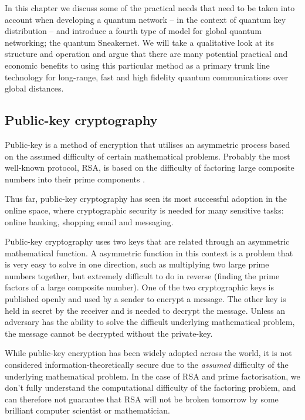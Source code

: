 \documentclass[twocolumn, aps, rmp, amsmath, amssymb, nofootinbib, superscriptaddress, longbibliography, floatfix, table-of-contents, eqsecnum]{revtex4-2}
\begin{document}
In this chapter we discuss some of the practical needs that need to be taken into account when developing a quantum network -- in the context of quantum key distribution -- and introduce a fourth type of model for global quantum networking; the quantum Sneakernet. We will take a qualitative look at its structure and operation and argue that there are many potential practical and economic benefits to using this particular method as a primary trunk line technology for long-range, fast and high fidelity quantum communications over global distances.

\subsection{Public-key cryptography}

Public-key is a method of encryption that utilises an asymmetric process based on the assumed difficulty of certain mathematical problems. Probably the most well-known protocol, RSA, is based on the difficulty of factoring large composite numbers into their prime components \cite{?}. 

Thus far, public-key cryptography has seen its most successful adoption in the online space, where cryptographic security is needed for many sensitive tasks: online banking, shopping email and messaging. 

Public-key cryptography uses two keys that are related through an asymmetric mathematical function. A asymmetric function in this context is a problem that is very easy to solve in one direction, such as multiplying two large prime numbers together, but extremely difficult to do in reverse (finding the prime factors of a large composite number). One of the two cryptographic keys is published openly and used by a sender to encrypt a message. The other key is held in secret by the receiver and is needed to decrypt the message. Unless an adversary has the ability to solve the difficult underlying mathematical problem, the message cannot be decrypted without the private-key. 

While public-key encryption has been widely adopted across the world, it is not considered information-theoretically secure due to the \textit{assumed} difficulty of the underlying mathematical problem. In the case of RSA and prime factorisation, we don't fully understand the computational difficulty of the factoring problem, and can therefore not guarantee that RSA will not be broken tomorrow by some brilliant computer scientist or mathematician. 
\end{document}
